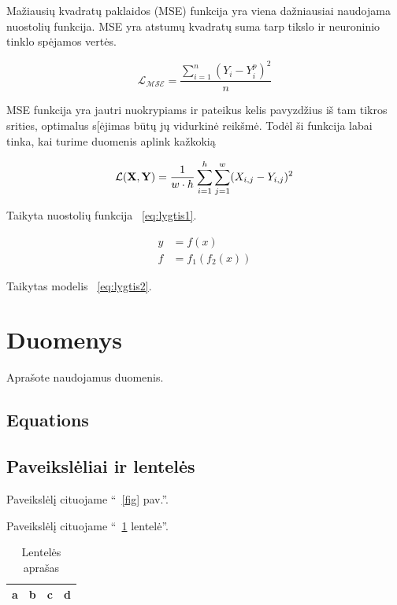 \documentclass[conference]{IEEEtran}
\begin{document}
Mažiausių kvadratų paklaidos (MSE) funkcija yra viena dažniausiai naudojama nuostolių funkcija. MSE yra atstumų kvadratų suma tarp tikslo ir neuroninio tinklo spėjamos vertės. 

\begin{equation}
\mathcal{L_{MSE}} = \frac{\sum_{i=1}^n(Y_{i}-Y_{i}^p)^2}{n}
\label{eq:MSE function}
\end{equation}

MSE funkcija yra jautri nuokrypiams ir pateikus kelis pavyzdžius iš tam tikros srities, optimalus s[ėjimas būtų jų vidurkinė reikšmė. Todėl ši funkcija labai tinka, kai turime duomenis aplink kažkokią 

\begin{equation}
\mathcal{L}({\bf X}, {\bf Y}) = \frac{1}{w \cdot h} \sum_{i=1}^h \sum_{j=1}^w (X_{i, j} - Y_{i, j})^2
\label{eq:lygtis1}
\end{equation}

Taikyta nuostolių funkcija ~\eqref{eq:lygtis1}.

\begin{align}
y & = f(x) \nonumber \\
f & = f_1(f_2(x))
\label{eq:lygtis2}
\end{align}

Taikytas modelis ~\eqref{eq:lygtis2}.


\section{Duomenys}
Aprašote naudojamus duomenis.

\subsection{Equations}



\subsection{Paveikslėliai ir lentelės}

Paveikslėlį cituojame ``~\ref{fig} pav.''.

Paveikslėlį cituojame ``~\ref{tab1} lentelė''.

\begin{table}[htbp]
\caption{Lentelės aprašas}
\begin{center}
\begin{tabular}{|c|c|c|c|}
\hline
a & b & c &  d \\
\hline
\end{tabular}
\label{tab1}
\end{center}
\end{table}
\end{document}
